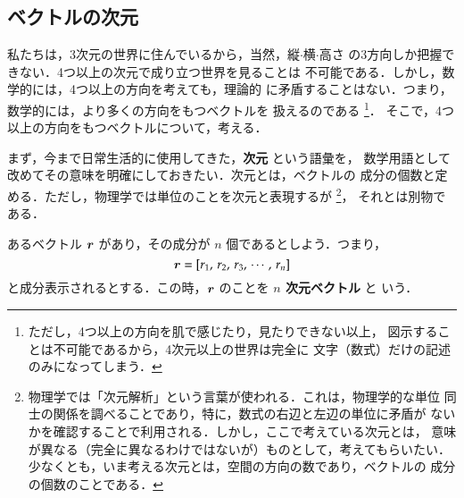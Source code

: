             \subsection{ベクトルの次元}
            私たちは，3次元の世界に住んでいるから，当然，縦$\cdot$横$\cdot$高さ
            の3方向しか把握できない．4つ以上の次元で成り立つ世界を見ることは
            不可能である．しかし，数学的には，4つ以上の方向を考えても，理論的
            に矛盾することはない．つまり，数学的には，より多くの方向をもつベクトルを
            扱えるのである
                \footnote{
                    ただし，4つ以上の方向を肌で感じたり，見たりできない以上，
                    図示することは不可能であるから，4次元以上の世界は完全に
                    文字（数式）だけの記述のみになってしまう．
                }．
            そこで，4つ以上の方向をもつベクトルについて，考える．

            まず，今まで日常生活的に使用してきた，\textbf{次元} という語彙を，
            数学用語として改めてその意味を明確にしておきたい．次元とは，ベクトルの
            成分の個数と定める．ただし，物理学では単位のことを次元と表現するが
                \footnote{
                    物理学では「次元解析」という言葉が使われる．これは，物理学的な単位
                    同士の関係を調べることであり，特に，数式の右辺と左辺の単位に矛盾が
                    ないかを確認することで利用される．しかし，ここで考えている次元とは，
                    意味が異なる（完全に異なるわけではないが）ものとして，考えてもらいたい．
                    少なくとも，いま考える次元とは，空間の方向の数であり，ベクトルの
                    成分の個数のことである．
                }，
            それとは別物である．

            あるベクトル $\boldsymbol{r}$ があり，その成分が $n$ 個であるとしよう．つまり，
                \begin{equation*}
                    \boldsymbol{r} = \left[r_{1},\,r_{2},\,r_{3},\,\cdots,\,r_{n}\right]
                \end{equation*}
            と成分表示されるとする．この時，$\boldsymbol{r}$ のことを \textbf{$n$ 次元ベクトル} と
            いう．

